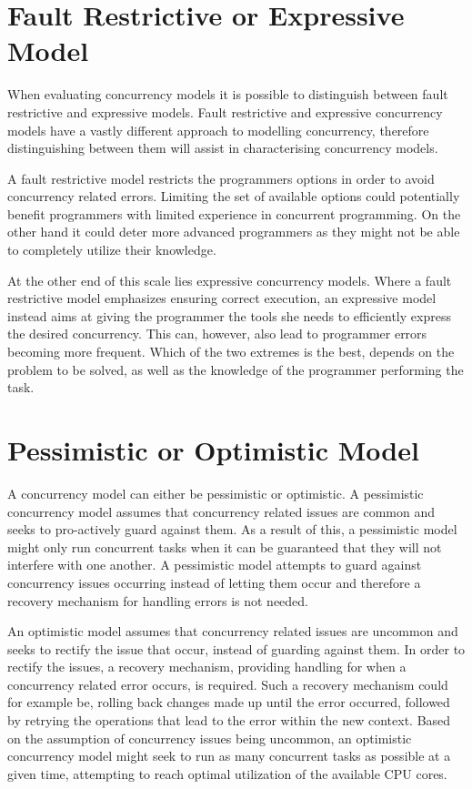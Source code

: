 \section{Fault Restrictive or Expressive Model}\label{sec:char:f_restrictive_expressive}
When evaluating concurrency models it is possible to distinguish between fault restrictive and expressive models. Fault restrictive and expressive concurrency models have a vastly different approach to modelling concurrency, therefore distinguishing between them will assist in characterising concurrency models. 

A fault restrictive model restricts the programmers options in order to avoid concurrency related errors. Limiting the set of available options could potentially benefit programmers with limited experience in concurrent programming. On the other hand it could deter more advanced programmers as they might not be able to completely utilize their knowledge.

At the other end of this scale lies expressive concurrency models. Where a fault restrictive model emphasizes ensuring correct execution, an expressive model instead aims at giving the programmer the tools she needs to efficiently express the desired concurrency. This can, however, also lead to programmer errors becoming more frequent. Which of the two extremes is the best, depends on the problem to be solved, as well as the knowledge of the programmer performing the task.
 
\section{Pessimistic or Optimistic Model}\label{sec:char_pessi_opti}
A concurrency model can either be pessimistic or optimistic. A pessimistic concurrency model assumes that concurrency related issues are common and seeks to pro-actively guard against them\cite[p. 170]{weikum2001transactional}. As a result of this, a pessimistic model might only run concurrent tasks when it can be guaranteed that they will not interfere with one another. A pessimistic model attempts to guard against concurrency issues occurring instead of letting them occur and therefore a recovery mechanism for handling errors is not needed.

An optimistic model assumes that concurrency related issues are uncommon and seeks to rectify the issue that occur, instead of guarding against them\cite[p. 170]{weikum2001transactional}. In order to rectify the issues, a recovery mechanism, providing handling for when a concurrency related error occurs, is required. Such a recovery mechanism could for example be, rolling back changes made up until the error occurred, followed by retrying the operations that lead to the error within the new context. Based on the assumption of concurrency issues being uncommon, an optimistic concurrency model might seek to run as many concurrent tasks as possible at a given time, attempting to reach optimal utilization of the available \ac{CPU} cores.

